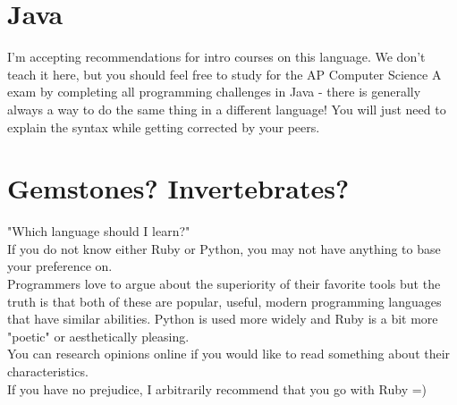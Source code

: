 \documentclass{42-en}
\begin{document}
\section{Java}
I'm accepting recommendations for intro courses on this language. We don't teach it here, but you should feel free to study for the AP Computer Science A exam by completing all programming challenges in Java - there is generally always a way to do the same thing in a different language! You will just need to explain the syntax while getting corrected by your peers.



\section{Gemstones? Invertebrates?}

"Which language should I learn?"\\

If you do not know either Ruby or Python, you may not have anything to base your preference on.\\

Programmers love to argue about the superiority of their favorite tools but the truth is that both of these are popular, useful, modern programming languages that have similar abilities. Python is used more widely and Ruby is a bit more "poetic" or aesthetically pleasing.\\

You can research opinions online if you would like to read something about their characteristics.\\

If you have no prejudice, I arbitrarily recommend that you go with Ruby =)\\
\end{document}
